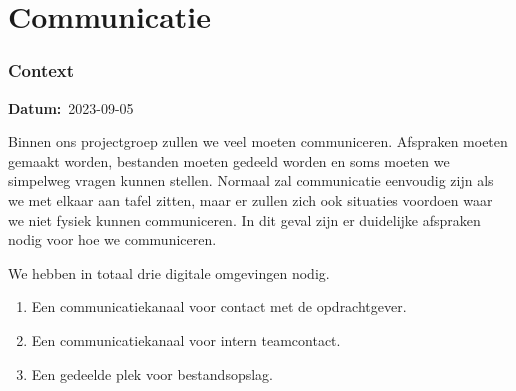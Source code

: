 \documentclass[a4paper]{report}
\newcommand{\teambox}{
  \begin{tcolorbox}[hbox, colback=blue!5!white,colframe=blue!75!black,
    left=.1mm, right=.1mm, top=.1mm, bottom=.1mm, fontupper=\scriptsize\sffamily]
    Team Keuze
  \end{tcolorbox}
}
\newcommand{\teamchoice}[1]{
  \section[ #1 ]{#1~\mbox{\raisebox{-2.5pt}{\teambox}}}
}
\newcommand{\timestamp}[1]{
  \mbox{\scriptsize \textbf{Datum:} #1} \smallbreak
}
\begin{document}
\teamchoice{Communicatie}
\subsubsection{Context}
\timestamp{2023-09-05}
Binnen ons projectgroep zullen we veel moeten communiceren. Afspraken moeten gemaakt worden, bestanden moeten gedeeld worden en soms moeten we simpelweg vragen kunnen stellen.
Normaal zal communicatie eenvoudig zijn als we met elkaar aan tafel zitten, maar er zullen zich ook situaties voordoen waar we niet fysiek kunnen communiceren.
In dit geval zijn er duidelijke afspraken nodig voor hoe we communiceren.
\par \smallskip 
We hebben in totaal drie digitale omgevingen nodig.
\begin{enumerate}
  \item Een communicatiekanaal voor contact met de opdrachtgever.
  \item Een communicatiekanaal voor intern teamcontact.
  \item Een gedeelde plek voor bestandsopslag.
\end{enumerate}
\end{document}
